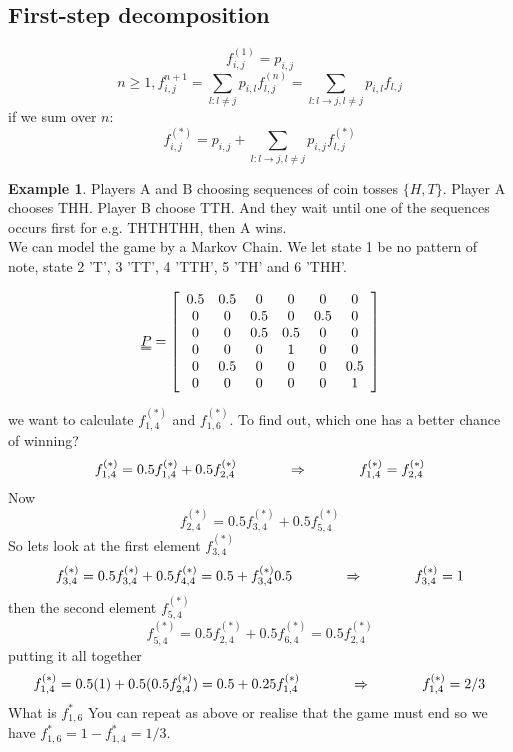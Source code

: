\documentclass{article}
\theoremstyle{definition}
\newtheorem{ex}[thm]{Example}
\begin{document}
\subsection*{First-step decomposition}

\[
f_{i,j}^{(1)} = p_{i,j}
\]
\[
n \geq 1, f_{i,j}^{n+1} = \sum_{l:l\neq j} p_{i,l}f_{l,j}^{(n)} = \sum_{l: l \rightarrow j, l \neq j} p_{i,l}f_{l,j}
\]
if we sum over $n$:
\[
f_{i,j}^{(\ast)} = p_{i,j} + \sum_{l : l \rightarrow j, l \neq j} p_{i,j}f_{l,j}^{(\ast)}
\]

\begin{ex}
Players A and B choosing sequences of coin tosses $\{H, T\}$.
Player A chooses THH.
Player B choose TTH.
And they wait until one of the sequences occurs first for e.g. THTHTHH, then A wins.\\

We can model the game by a Markov Chain. We let state 1 be no pattern of note, state 2 'T', 3 'TT', 4 'TTH', 5 'TH' and 6 'THH'.

\[
\uuline{P} = \left [ \begin{array}{cccccc}
0.5 & 0.5 & 0 & 0 & 0 & 0\\
0 & 0 & 0.5 & 0 & 0.5 & 0\\
0 & 0 & 0.5 & 0.5 & 0 & 0\\
0 & 0 & 0 & 1 & 0 & 0\\
0 & 0.5 & 0 & 0 & 0 & 0.5\\
0 & 0 & 0 & 0 & 0 & 1
\end{array} \right ]
\]

we want to calculate $f_{1,4}^{(\ast)}$ and $f_{1,6}^{(\ast)}$. To find out, which one has a better chance of winning?\\

\[
f_{1,4}^{(\ast)} = 0.5 f_{1,4}^{(\ast)} + 0.5 f_{2,4}^{(\ast)} \hspace*{0.5 in} \Rightarrow \hspace*{0.5 in} f_{1,4}^{(\ast)} = f_{2,4}^{(\ast)}
\]
Now
\[
f_{2,4}^{(\ast)} = 0.5 f_{3,4}^{(\ast)} + 0.5 f_{5,4}^{(\ast)}
\]
So lets look at the first element $f_{3,4}^{(\ast)}$
\[
f_{3,4}^{(\ast)} = 0.5 f_{3,4}^{(\ast)} + 0.5 f_{4,4}^{(\ast)} = 0.5 + f_{3,4}^{(\ast)} 0.5 \hspace*{0.5 in} \Rightarrow \hspace*{0.5 in} f_{3,4}^{(\ast)} = 1
\]
then the second element $f_{5,4}^{(\ast)}$
\[
f_{5,4}^{(\ast)} = 0.5 f_{2,4}^{(\ast)} + 0.5 f_{6,4}^{(\ast)} = 0.5 f_{2,4}^{(\ast)}
\]
putting it all together
\[
f_{1,4}^{(\ast)} = 0.5 (1) + 0.5 (0.5 f_{2,4}^{(\ast)}) = 0.5 + 0.25 f_{1,4}^{(\ast)} \hspace*{0.5 in} \Rightarrow \hspace*{0.5 in} f_{1,4}^{(\ast)} = 2/3
\]
What is $f_{1,6}^{\ast}$ You can repeat as above or realise that the game must end so we have $f_{1,6}^{\ast} = 1 - f_{1,4}^{\ast} = 1/3$.
\end{ex}
\end{document}
